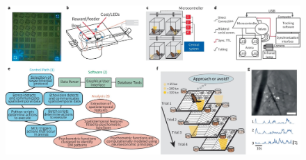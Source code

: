 \documentclass{article}
\begin{document}
\vspace{1em}

\begin{figure} %
  \centering
  \includegraphics[width=\textwidth]{Figs/Record_main_1.pdf}
\end{figure}

\clearpage
\end{document}
